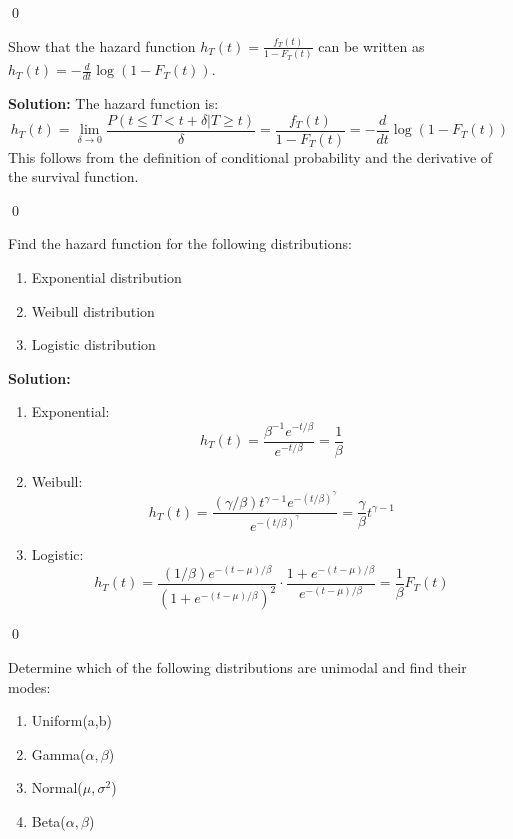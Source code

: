 \qed
\begin{problembox}
Show that the hazard function $h_T(t) = \frac{f_T(t)}{1-F_T(t)}$ can be written as $h_T(t) = -\frac{d}{dt}\log(1-F_T(t))$.
\end{problembox}

\noindent\textbf{Solution:}
The hazard function is:
\[
h_T(t) = \lim_{\delta\to 0}\frac{P(t\leq T<t+\delta|T\geq t)}{\delta} = \frac{f_T(t)}{1-F_T(t)} = -\frac{d}{dt}\log(1-F_T(t))
\]
This follows from the definition of conditional probability and the derivative of the survival function.


\qed
\begin{problembox}
Find the hazard function for the following distributions:
\begin{enumerate}[label=(\alph*)]
\item Exponential distribution
\item Weibull distribution
\item Logistic distribution
\end{enumerate}
\end{problembox}

\noindent\textbf{Solution:}
\begin{enumerate}[label=(\alph*)]
\item Exponential:
\[
h_T(t) = \frac{\beta^{-1}e^{-t/\beta}}{e^{-t/\beta}} = \frac{1}{\beta}
\]

\item Weibull:
\[
h_T(t) = \frac{(\gamma/\beta)t^{\gamma-1}e^{-(t/\beta)^\gamma}}{e^{-(t/\beta)^\gamma}} = \frac{\gamma}{\beta}t^{\gamma-1}
\]

\item Logistic:
\[
h_T(t) = \frac{(1/\beta)e^{-(t-\mu)/\beta}}{(1+e^{-(t-\mu)/\beta})^2} \cdot \frac{1+e^{-(t-\mu)/\beta}}{e^{-(t-\mu)/\beta}} = \frac{1}{\beta}F_T(t)
\]
\end{enumerate}


\qed
\begin{problembox}
Determine which of the following distributions are unimodal and find their modes:
\begin{enumerate}[label=(\alph*)]
\item Uniform(a,b)
\item Gamma($\alpha,\beta$)
\item Normal($\mu,\sigma^2$)
\item Beta($\alpha,\beta$)
\end{enumerate}
\end{problembox}

